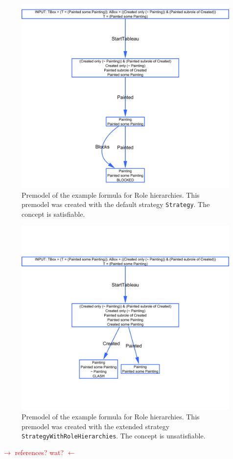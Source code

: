 \documentclass[11pt]{article} %
\begin{document}
\begin{figure}
\begin{center}
\includegraphics[scale=0.4]{premodelzondersubrole}
\caption{Premodel of the example formula for Role hierarchies. This premodel was created with the default strategy \texttt{Strategy}. The concept is satisfiable.}
\label{fig:zondersubrole}
\end{center}
\end{figure}

\begin{figure}
\begin{center}
\includegraphics[scale=0.4]{premodelmetsubrole}
\caption{Premodel of the example formula for Role hierarchies. This premodel was created with the extended strategy \texttt{StrategyWithRoleHierarchies}. The concept is unsatisfiable.}
\label{fig:metsubrole}
\end{center}
\end{figure}



\textcolor{red}{$\rightarrow$ references? wat? $\leftarrow$}



\end{document}
